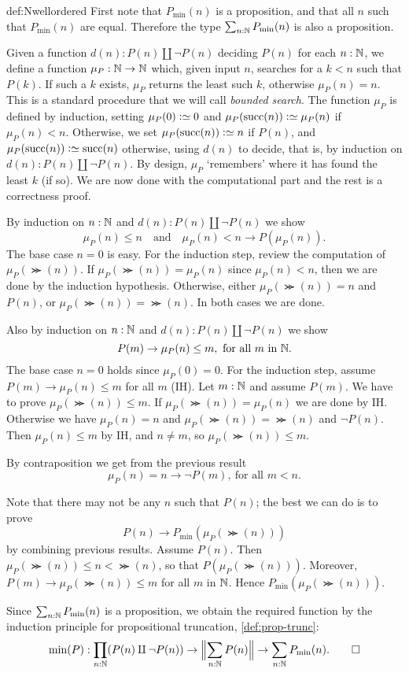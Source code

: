\begin{implementation}{def:Nwellordered}
First note that $P_{\min}(n)$ is a proposition,
and that all $n$ such that $P_{\min}(n)$
are equal. Therefore the type $\sum_{n:\NN} P_{\min}(n)$
is also a proposition.

Given a function $d(n): P(n)\amalg\neg P(n)$ deciding $P(n)$ for each $n:\NN$,
we define a function $\mu_P:\NN\to\NN$ which,
given input $n$, searches for a $k<n$ such that $P(k)$.
If such a $k$ exists, $\mu_P$ returns the least such $k$,
otherwise $\mu_P(n)=n$.
This is a standard procedure that we will call \emph{bounded search}.
The function $\mu_P$ is defined by induction, setting
$\mu_P(0)\defeq 0$ and
$\mu_P(\Succ(n))\defeq \mu_P(n)$ if $\mu_P(n) < n$.
Otherwise, we set $\mu_P(\Succ(n))\defeq n$ if $P(n)$,
and $\mu_P(\Succ(n))\defeq \Succ(n)$ otherwise, using $d(n)$ to decide,
that is, by induction on $d(n):P(n)\amalg\neg P(n)$.
By design, $\mu_P$ `remembers' where it has found the least $k$ (if so).
We are now done with the computational part and the rest
is a correctness proof.

By induction on $n:\NN$ and $d(n): P(n)\amalg\neg P(n)$ we show
\[
\mu_P(n)\leq n \quad\text{and}\quad \mu_P(n)<n \to P(\mu_P(n)).
\]
The base case $n=0$ is easy. For the induction step,
review the computation of $\mu_P(\Succ(n))$. If $\mu_P(\Succ(n))=\mu_P(n)$
since $\mu_P(n) < n$, then we are done by the induction hypothesis.
Otherwise, either $\mu_P(\Succ(n))=n$ and $P(n)$, or $\mu_P(\Succ(n))=\Succ(n)$.
In both cases we are done.

Also by induction on $n:\NN$ and $d(n): P(n)\amalg\neg P(n)$ we show
\[
P(m) \to \mu_P(n)\leq m,~ \text{for all $m$ in $\NN$.}
\]
The base case $n=0$ holds since $\mu_P(0)=0$. For the induction step,
assume $P(m) \to \mu_P(n)\leq m$ for all $m$ (IH). Let $m:\NN$
and assume $P(m)$. We have to prove $\mu_P(\Succ(n))\leq m$.
If $\mu_P(\Succ(n))=\mu_P(n)$ we are done by IH. Otherwise we have
$\mu_P(n)=n$ and $\mu_P(\Succ(n)) = \Succ(n)$ and $\neg P(n)$.
Then $\mu_P(n)\leq m$ by IH, and $n\neq m$, so $\mu_P(\Succ(n))\leq m$.

By contraposition we get from the previous result
\[
\mu_P(n)= n \to \neg P(m),~\text{for all $m<n$.}
\]

Note that there may not be any $n$ such that $P(n)$;
the best we can do is to prove
\[
P(n)\to P_{\min}(\mu_P(\Succ(n)))
\]
by combining previous results. Assume $P(n)$.
Then $\mu_P(\Succ(n))\leq n < \Succ(n)$, so that $P(\mu_P(\Succ(n)))$.
Moreover, $P(m) \to \mu_P(\Succ(n))\leq m$ for all $m$ in $\NN$.
Hence $P_{\min}(\mu_P(\Succ(n)))$.

Since $\sum_{n:\NN} P_{\min}(n)$ is a proposition,
we obtain the required function by the induction
principle for propositional truncation, \cref{def:prop-trunc}:
\[
\min(P) : \prod_{n:\NN}(P(n)\amalg\neg P(n)) \to
           \Trunc[\Big]{\sum_{n:\NN} P(n)} \to  \sum_{n:\NN} P_{\min}(n).\qedhere
\]
\end{implementation}


